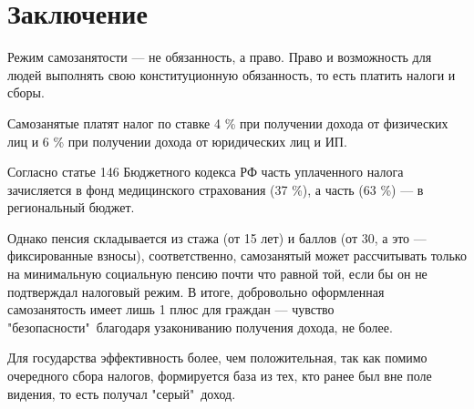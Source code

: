 \section*{Заключение}

Режим самозанятости --- не обязанность, а право. 
Право и возможность для людей выполнять свою конституционную обязанность, 
то есть платить налоги и сборы. 

Самозанятые платят налог по ставке 
4 \% при получении дохода от физических лиц и 
6 \% при получении дохода от юридических лиц и ИП. 

Согласно статье 146 Бюджетного кодекса РФ 
часть уплаченного налога зачисляется в фонд медицинского страхования (37 \%), 
а часть (63 \%) — в региональный бюджет. 

Однако пенсия складывается из стажа (от 15 лет) 
и баллов (от 30, а это --- фиксированные взносы), 
соответственно, самозанятый может рассчитывать 
только на минимальную социальную пенсию почти что равной той, 
если бы он не подтверждал налоговый режим. 
В итоге, добровольно оформленная самозанятость имеет лишь 
1 плюс для граждан --- чувство "безопасности"\ благодаря узакониванию получения дохода, 
не более. 

Для государства эффективность более, чем положительная, 
так как помимо очередного сбора налогов, 
формируется база из тех, 
кто ранее был вне поле видения, 
то есть получал "серый"\ доход.
